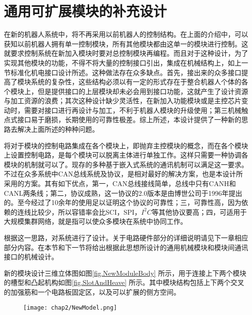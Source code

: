 \section{通用可扩展模块的补充设计}
在新的机器人系统中，将不再采用以前机器人的控制结构。在上面的介绍中，可以获知以前机器人拥有单一控制模块，所有其他模块都由这单一的模块进行控制。这就要求控制系统在新加入模块时要对总控制模块再编程。而且对于这种设计，为了实现其他模块的功能，不得不将大量的控制接口引出，集成在机械结构上，如上一节标准化机电接口设计所述。这种做法存在众多缺点。首先，接出来的众多接口提高了模块系统的复杂性，这些结构必须以有一定的形式存在于整合机器人个体的各个模块上，但是提供接口的上层模块却未必会用到接口功能，这就产生了设计资源与加工资源的浪费；其次这种设计缺少灵活性，在新加入功能模块或是主控芯片变动时，需要对接口进行再设计与加工，不利于机器人模块的升级使用；第三机械触点式接口易于磨损，长期使用的可靠性极差。综上所述，本设计提供了一种新的思路去解决上面所述的种种问题。

将对于模块的控制电路集成在各个模块上，即抛弃主控模块的概念，而在各个模块上设置控制电路，是每个模块可以脱离主体进行单独工作。这样只需要一种协调各模块的机制就可以了。现存的多种基于嵌入式系统的通讯机制可以满足这一要求。不过在众多系统中CAN总线系统及协议，是相对最好的解决方案，也是本设计所采用的方案。其有如下优点，第一，CAN总线接线简单，总线中只有CANH和CANL两条线；第二，协议成熟，这一协议的2.0版本是由博世公司于1996年提出的。至今经过了10余年的使用足以证明这个协议的可靠性；三，可靠性高，因为依赖的连线比较少，所以容错率会比SCI，SPI，$I^2C$等其他协议要高；四，可适用于大规模集群网络，就是指可以使众多模块在系统中协同工作。

根据这一思路，对系统进行了设计。关于电路硬件部分的详细说明请见下一章相应部分内容。在本节和下一节将给出根据此思想所设计的通用机械模块和模块间通讯接口的机械设计。

新的模块设计三维立体图如图\ref{fig.NewModuleBody} 所示，用于连接上下两个模块的槽型和凸起机构如图\ref{fig.SlotAndHeave} 所示。其中模块结构包括上下两个交叉的加强筋和一个电路板固定区，以及可以扩展的侧方空间。
\begin{figure}[!htp]
  \centering
  \texttt{[image: chap2/NewModel.png]}
\end{figure}
\begin{figure}
  \centering
\end{figure}
